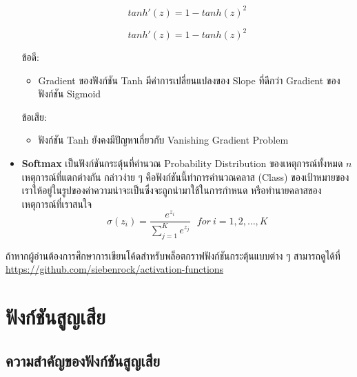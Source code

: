 \begin{itemize}
\begin{figure}[H]
\begin{subfigure}{0.5\textwidth}
            \caption{%
                \begin{equation}
                    tanh'(z) = 1 - tanh(z)^{2}
                \end{equation}
            }
            \label{fig:actfunc_tanh_der}
        \end{subfigure}
    \end{figure}

    ข้อดี:
    \begin{itemize}
        \item Gradient ของฟังก์ชัน Tanh มีค่าการเปลี่ยนแปลงของ Slope ที่ดีกว่า Gradient ของฟังก์ชัน Sigmoid
    \end{itemize}
    ข้อเสีย:
    \begin{itemize}
        \item ฟังก์ชัน Tanh ยังคงมีปัญหาเกี่ยวกับ Vanishing Gradient Problem
    \end{itemize}

    \item \textbf{Softmax} เป็นฟังก์ชันกระตุ้นที่คำนวณ Probability Distribution ของเหตุการณ์ทั้งหมด $n$ เหตุการณ์ที่แตกต่างกัน 
    กล่าวง่าย ๆ คือฟังก์ชันนี้ทำการคำนวณคลาส (Class) ของเป้าหมายของเราให้อยู่ในรูปของค่าความน่าจะเป็นซึ่งจะถูกนำมาใช้ในการกำหนด%
    หรือทำนายคลาสของเหตุการณ์ที่เราสนใจ
    \begin{equation}
        \sigma(z_i) = \frac{e^{z_{i}}}{\sum_{j=1}^K e^{z_{j}}} \ \ \ for\ i=1,2,\dots,K
    \end{equation}
\end{itemize}

ถ้าหากผู้อ่านต้องการศึกษาการเขียนโค้ดสำหรับพล็อตกราฟฟังก์ชันกระตุ้นแบบต่าง ๆ สามารถดูได้ที่ 
\url{https://github.com/siebenrock/activation-functions}

\section{ฟังก์ชันสูญเสีย}
\label{sec:loss_func}

\subsection{ความสำคัญของฟังก์ชันสูญเสีย}

